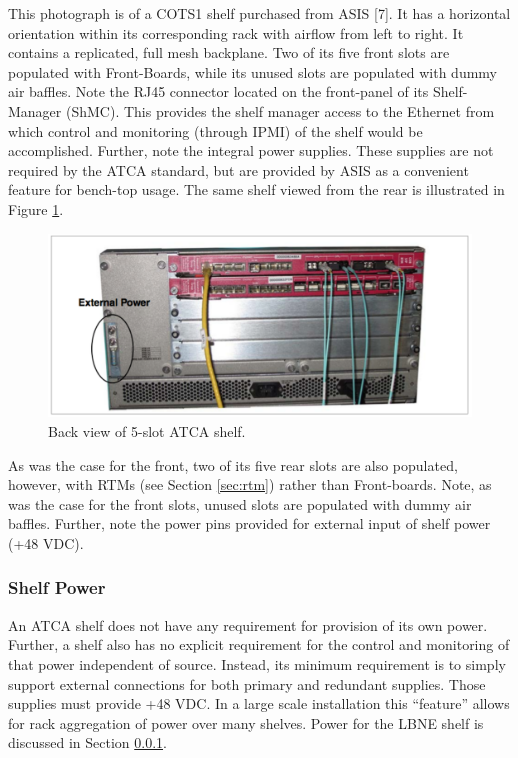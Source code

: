 This photograph is of a COTS1 shelf purchased from ASIS [7]. It has a horizontal orientation within its corresponding rack with airflow from left to right. It contains a replicated, full mesh backplane. Two of its five front slots are populated with Front-Boards, while its unused slots are populated with dummy air baffles. Note the RJ45 connector located on the front-panel of its Shelf-Manager (ShMC). This provides the shelf manager access to the Ethernet from which control and monitoring (through IPMI) of the shelf would be accomplished. Further, note the integral power supplies. These supplies are not required by the ATCA standard, but are provided by ASIS as a convenient feature for bench-top usage. The same shelf viewed from the rear is illustrated in Figure \ref{fig:backShelf}.

\begin{figure}[tbh]
\includegraphics[scale=0.8]{shelf-back.pdf}
\caption{Back view of 5-slot ATCA shelf.}
\label{fig:backShelf}
\end{figure} 

As was the case for the front, two of its five rear slots are also populated, however, with RTMs (see Section \ref{sec:rtm}) rather than Front-boards. Note, as was the case for the front slots, unused slots are populated with dummy air baffles. Further, note the power pins provided for external input of shelf power (+48 VDC).

\subsubsection{Shelf Power}
\label{sec:shelfpower}
An ATCA shelf does not have any requirement for provision of its own power. Further, a shelf also has no explicit requirement for the control and monitoring of that power independent of source. Instead, its minimum requirement is to simply support external connections for both primary and redundant supplies. Those supplies must provide +48 VDC. In a large scale installation this “feature” allows for rack aggregation of power over many shelves.
Power for the LBNE shelf is discussed in Section \ref{sec:shelfpower}.

